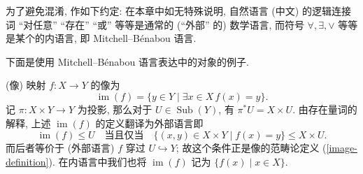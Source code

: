 \begin{remark}
	{}
		为了避免混淆, 作如下约定: 在本章中如无特殊说明, 自然语言 (中文) 的逻辑连接词 ``对任意'' ``存在'' ``或'' 等等是通常的 (``外部'' 的) 数学语言,
	而符号 $\forall,\exists,\lor$ 等等是某个\topos{}的内语言, 即 Mitchell--B\'enabou 语言.
\end{remark}

下面是使用 Mitchell--B\'enabou 语言表达\topos{}中的对象的例子.

\begin{example}
	[label={image-internal-definition}]
	{(像)}
	映射 $f\colon X\to Y$ 的像为
	\[
	\operatorname{im}(f) = \{y\in Y\mid \exists x\in X\, f(x) = y\}.
	\]
	记 $\pi\colon X\times Y\to Y$ 为投影, 那么对于 $U\in\operatorname{Sub}(Y)$, 有 $\pi^* U=X\times U$.
	由存在量词的解释, 上述 $\operatorname{im}(f)$ 的定义翻译为外部语言即
	\[
	\operatorname{im}(f)\leq U \quad \text{当且仅当} \quad \{(x,y)\in X\times Y \mid f(x)=y\} \leq X\times U.
	\]
	而后者等价于 (外部语言) $f$ 穿过 $U\hookrightarrow Y$; 故这个条件正是像的范畴论定义 (\ref{image-definition}).
	在内语言中我们也将 $\operatorname{im}(f)$ 记为 $\{f(x)\mid x\in X\}$.
\end{example}

